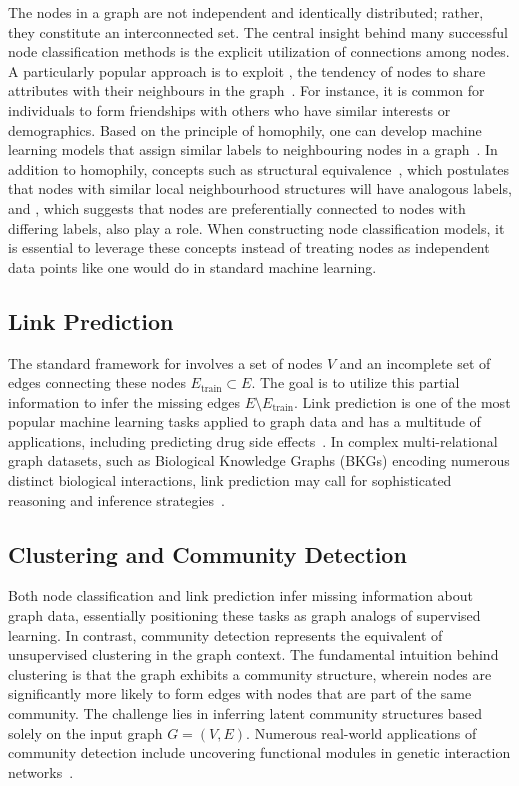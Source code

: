 The nodes in a graph are not independent and identically distributed; rather, they constitute an interconnected set. The central insight behind many successful node classification methods is the explicit utilization of connections among nodes. A particularly popular approach is to exploit , the tendency of nodes to share attributes with their neighbours in the graph~\cite{Mcpherson2001homophilyInSocialNw}. For instance, it is common for individuals to form friendships with others who have similar interests or demographics. Based on the principle of homophily, one can develop machine learning models that assign similar labels to neighbouring nodes in a graph~\cite{Zhou2003LearningLocalGlobalConsistency}. In addition to homophily, concepts such as structural equivalence~\cite{Donnat2017GraphWaveletsStructuralRoleSimilarityComplexNws}, which postulates that nodes with similar local neighbourhood structures will have analogous labels, and , which suggests that nodes are preferentially connected to nodes with differing labels, also play a role. When constructing node classification models, it is essential to leverage these concepts instead of treating nodes as independent data points like one would do in standard machine learning.

\subsection{Link Prediction}
The standard framework for  involves a set of nodes $ V $ and an incomplete set of edges connecting these nodes $ E_\text{train} \subset E $. The goal is to utilize this partial information to infer the missing edges $ E \setminus E_\text{train} $. Link prediction is one of the most popular machine learning tasks applied to graph data and has a multitude of applications, including predicting drug side effects~\cite{Zitnik2018ModelingPolypharmacySideEffectsGCN}. In complex multi-relational graph datasets, such as Biological Knowledge Graphs (BKGs) encoding numerous distinct biological interactions, link prediction may call for sophisticated reasoning and inference strategies~\cite{Nickel2015ReviewRelationalMLKG}.

\subsection{Clustering and Community Detection}
Both node classification and link prediction infer missing information about graph data, essentially positioning these tasks as graph analogs of supervised learning. In contrast, community detection represents the equivalent of unsupervised clustering in the graph context. The fundamental intuition behind clustering is that the graph exhibits a community structure, wherein nodes are significantly more likely to form edges with nodes that are part of the same community. The challenge lies in inferring latent community structures based solely on the input graph $ G = (V, E) $. Numerous real-world applications of community detection include uncovering functional modules in genetic interaction networks~\cite{Agrawal2018LargeScaleAnalysisDiseasePathwaysHumanInteractome}.

